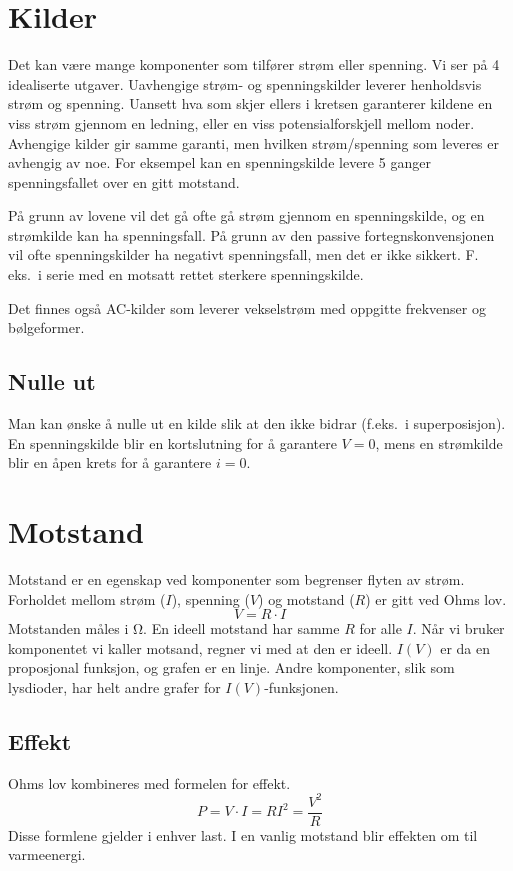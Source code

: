 \documentclass[12pt,a4paper,norsk]{article}
\begin{document}
\section{Kilder}
Det kan være mange komponenter som tilfører strøm eller spenning. Vi ser på 4
idealiserte utgaver. Uavhengige strøm- og spenningskilder leverer henholdsvis
strøm og spenning. Uansett hva som skjer ellers i kretsen garanterer kildene en
viss strøm gjennom en ledning, eller en viss potensialforskjell mellom noder.
Avhengige kilder gir samme garanti, men hvilken strøm/spenning som leveres er
avhengig av noe. For eksempel kan en spenningskilde levere 5 ganger
spenningsfallet over en gitt motstand.

På grunn av lovene vil det gå ofte gå strøm gjennom en spenningskilde, og en strømkilde
kan ha spenningsfall. På grunn av den passive fortegnskonvensjonen
vil ofte spenningskilder ha negativt spenningsfall, men det er ikke sikkert. F.
eks.\ i serie med en motsatt rettet sterkere spenningskilde.

Det finnes også AC-kilder som leverer vekselstrøm med oppgitte frekvenser og bølgeformer.

\subsection{Nulle ut}
Man kan ønske å nulle ut en kilde slik at den ikke bidrar (f.eks.\ i
superposisjon). En spenningskilde blir en kortslutning for å garantere $V=0$,
mens en strømkilde blir en åpen krets for å garantere $i=0$.

\section{Motstand}
Motstand er en egenskap ved komponenter som begrenser flyten av strøm. Forholdet
mellom strøm ($I$), spenning ($V$) og motstand ($R$) er gitt ved Ohms lov.
\[V = R \cdot I\]
Motstanden måles i \si{\ohm}. En ideell motstand har samme $R$ for alle $I$. Når
vi bruker komponentet vi kaller motsand, regner vi med at den er ideell. $I(V)$
er da en proposjonal funksjon, og grafen er en linje. Andre komponenter, slik
som lysdioder, har helt andre grafer for $I(V)$-funksjonen.

\subsection{Effekt}
Ohms lov kombineres med formelen for effekt.
\[P = V \cdot I = RI^{2} = \frac{V^{2}}{R}\]
Disse formlene gjelder i enhver last. I en vanlig motstand blir effekten om til
varmeenergi.
\end{document}
